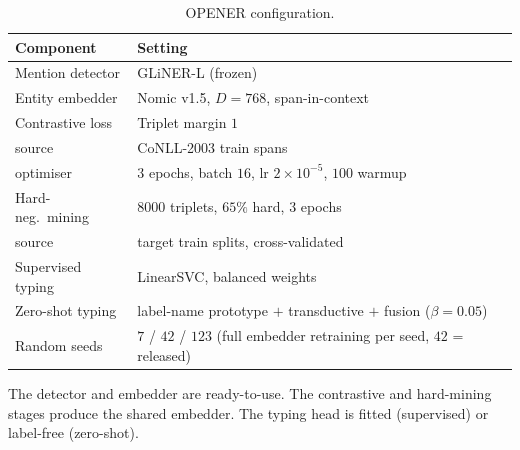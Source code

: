 \documentclass[pdflatex,sn-basic,Numbered]{sn-jnl}
\begin{document}
\begin{table}[!h]
\centering
\caption{OPENER configuration.}
\label{tab:hyperparams}
\small
\begin{tabular}{ll}
\toprule
Component & Setting \\
\midrule
Mention detector   & GLiNER-L (frozen) \cite{zaratiana2024gliner} \\
Entity embedder    & Nomic v1.5, $D{=}768$, span-in-context \cite{nussbaum2024nomic} \\
Contrastive loss   & Triplet margin $1$ \cite{schroff2015facenet} \\
\quad source        & CoNLL-2003 train spans \cite{tjongkimsang2003conll} \\
\quad optimiser     & $3$ epochs, batch $16$, lr $2\times10^{-5}$, $100$ warmup \\
Hard-neg.\ mining  & $8000$ triplets, $65\%$ hard, $3$ epochs \\
\quad source        & target train splits, cross-validated \\
Supervised typing  & LinearSVC, balanced weights \cite{fan2008liblinear} \\
Zero-shot typing   & label-name prototype $+$ transductive $+$ fusion ($\beta{=}0.05$) \\
Random seeds       & $7$ / $42$ / $123$ (full embedder retraining per seed, $42$ = released) \\
\bottomrule
\end{tabular}
\begin{tablenotes}[flushleft]
\footnotesize
\item The detector and embedder are ready-to-use. The contrastive and hard-mining stages produce the shared embedder. The typing head is fitted (supervised) or label-free (zero-shot).
\end{tablenotes}
\end{table}
\FloatBarrier
\end{document}
